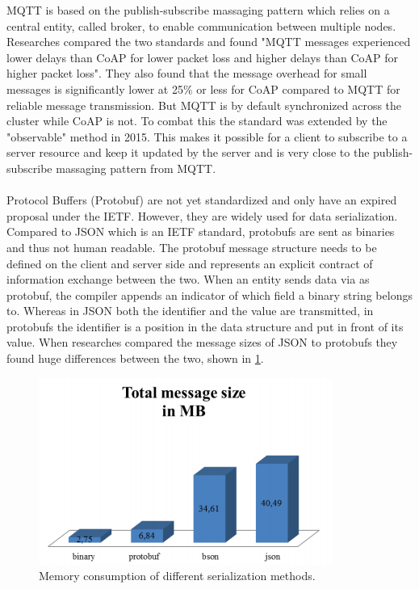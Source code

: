 MQTT is based on the publish-subscribe massaging pattern which relies on a central entity, called broker, to enable communication between multiple nodes. Researches compared the two standards and found "MQTT messages experienced lower delays than CoAP for lower packet loss and higher delays than CoAP for higher packet loss"\cite{MQTTvsCoAPAnalysisIEEE}. They also found that the message overhead for small messages is significantly lower at 25\% or less for CoAP compared to MQTT for reliable message transmission. But MQTT is by default synchronized across the cluster while CoAP is not. To combat this the standard was extended by the "observable" method in 2015\cite{RFC7641observableCoAP}. This makes it possible for a client to subscribe to a server resource and keep it updated by the server and is very close to the publish-subscribe massaging pattern from MQTT.\\[5mm]
{}\\
Protocol Buffers (Protobuf) are not yet standardized and only have an expired proposal under the IETF\cite{rfernando-protocol-buffers-00}. However, they are widely used for data serialization. Compared to JSON which is an IETF standard, protobufs are sent as binaries and thus not human readable. The protobuf message structure needs to be defined on the client and server side and represents an explicit contract of information exchange between the two. When an entity sends data via as protobuf, the compiler appends an indicator of which field a binary string belongs to. Whereas in JSON both the identifier and the value are transmitted, in protobufs the identifier is a position in the data structure and put in front of its value.
When researches compared the message sizes of JSON to protobufs they found huge differences between the two, shown in \cref{fig:jsonVsProtobufs}.
\begin{figure}[h!]
    \centering
    \includegraphics[scale=0.45]{figures/jsonVsProtobufs.png}
    \caption{Memory consumption of different serialization methods\cite{}.}
    \label{fig:jsonVsProtobufs}
\end{figure}
